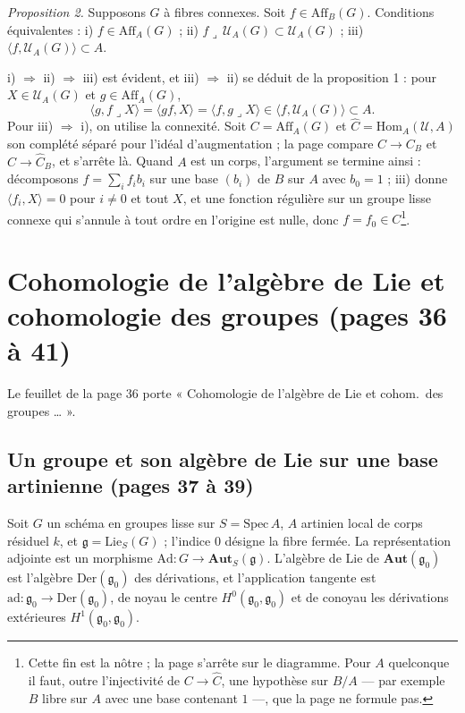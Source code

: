 \documentclass[11pt,a4paper]{article}
\begin{document}
\emph{Proposition 2.} Supposons $G$ à fibres connexes. Soit $f \in
\mathrm{Aff}_B(G)$. Conditions équivalentes : i) $f \in \mathrm{Aff}_A(G)$ ;
ii) $f \lrcorner\, \mathcal{U}_A(G) \subset \mathcal{U}_A(G)$ ; iii)
$\langle f, \mathcal{U}_A(G) \rangle \subset A$.

i) $\Rightarrow$ ii) $\Rightarrow$ iii) est évident, et iii) $\Rightarrow$ ii) se
déduit de la proposition 1 : pour $X \in \mathcal{U}_A(G)$ et $g \in
\mathrm{Aff}_A(G)$,
\[
\langle g, f \lrcorner X \rangle = \langle gf, X \rangle = \langle f, g \lrcorner X
\rangle \in \langle f, \mathcal{U}_A(G) \rangle \subset A .
\]
Pour iii) $\Rightarrow$ i), on utilise la connexité. Soit $C = \mathrm{Aff}_A(G)$
et $\widehat{C} = \mathrm{Hom}_A(\mathcal{U}, A)$ son complété séparé pour
l'idéal d'augmentation ; la page compare $C \to C_B$ et $\widehat{C} \to
\widehat{C}_B$, et s'arrête là. Quand $A$ est un corps, l'argument se termine
ainsi : décomposons $f = \sum_i f_i b_i$ sur une base $(b_i)$ de $B$ sur $A$ avec
$b_0 = 1$ ; iii) donne $\langle f_i, X \rangle = 0$ pour $i \neq 0$ et tout $X$, et
une fonction régulière sur un groupe lisse connexe qui s'annule à tout ordre en
l'origine est nulle, donc $f = f_0 \in C$\footnote{Cette fin est la nôtre ; la
page s'arrête sur le diagramme. Pour $A$ quelconque il faut, outre l'injectivité
de $C \to \widehat{C}$, une hypothèse sur $B/A$ — par exemple $B$ libre sur $A$
avec une base contenant $1$ —, que la page ne formule pas.}.

\section*{Cohomologie de l'algèbre de Lie et cohomologie des groupes (pages 36 à 41)}

Le feuillet de la page 36 porte « Cohomologie de l'algèbre de Lie et cohom.\ des
groupes … ».

\subsection*{Un groupe et son algèbre de Lie sur une base artinienne (pages 37 à 39)}

Soit $G$ un schéma en groupes lisse sur $S = \mathrm{Spec}\,A$, $A$ artinien
local de corps résiduel $k$, et $\mathfrak{g} = \mathrm{Lie}_S(G)$ ; l'indice $0$
désigne la fibre fermée. La représentation adjointe est un morphisme
$\mathrm{Ad} : G \to \mathbf{Aut}_S(\mathfrak{g})$. L'algèbre de Lie de
$\mathbf{Aut}(\mathfrak{g}_0)$ est l'algèbre $\mathrm{Der}(\mathfrak{g}_0)$ des
dérivations, et l'application tangente est $\mathrm{ad} : \mathfrak{g}_0 \to
\mathrm{Der}(\mathfrak{g}_0)$, de noyau le centre $H^0(\mathfrak{g}_0,
\mathfrak{g}_0)$ et de conoyau les dérivations extérieures
$H^1(\mathfrak{g}_0,\mathfrak{g}_0)$.
\end{document}
